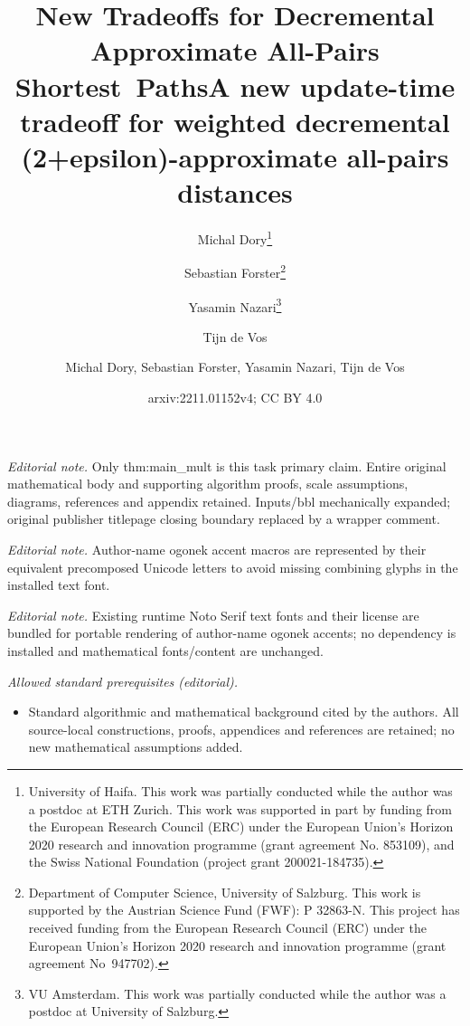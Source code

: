 \documentclass[11pt]{article}
\title{New Tradeoffs for Decremental Approximate All-Pairs Shortest~Paths}
\author{Michal Dory\thanks{University of Haifa. This work was partially conducted while the author was a postdoc at ETH Zurich. This work was supported in part by funding from the European Research Council (ERC) under the European Union’s Horizon 2020 research and innovation programme (grant agreement No. 853109), and the Swiss National Foundation (project grant 200021-184735).} \and  Sebastian Forster\thanks{Department of Computer Science, University of Salzburg. This work is supported by the Austrian Science Fund (FWF): P 32863-N. This project has received funding from the European Research Council (ERC) under the European Union's Horizon 2020 research and innovation programme (grant agreement No~947702).} \and Yasamin Nazari\thanks{VU Amsterdam. This work was partially conducted while the author was a postdoc at University of Salzburg.} \and Tijn de Vos\samethanks[2]}
\date{}
\title{A new update-time tradeoff for weighted decremental (2+epsilon)-approximate all-pairs distances}
\author{Michal Dory, Sebastian Forster, Yasamin Nazari, Tijn de Vos}
\date{arxiv:2211.01152v4; CC BY 4.0}
\theoremstyle{definition}
\theoremstyle{remark}
\begin{document}
\maketitle
\noindent\textit{Editorial note.} Only thm:main\_mult is this task primary claim. Entire original mathematical body and supporting algorithm proofs, scale assumptions, diagrams, references and appendix retained. Inputs/bbl mechanically expanded; original publisher titlepage closing boundary replaced by a wrapper comment.\par\medskip
\noindent\textit{Editorial note.} Author-name ogonek accent macros are represented by their equivalent precomposed Unicode letters to avoid missing combining glyphs in the installed text font.\par\medskip
\noindent\textit{Editorial note.} Existing runtime Noto Serif text fonts and their license are bundled for portable rendering of author-name ogonek accents; no dependency is installed and mathematical fonts/content are unchanged.\par\medskip
\noindent\textit{Allowed standard prerequisites (editorial).}\begin{itemize}
\item Standard algorithmic and mathematical background cited by the authors. All source-local constructions, proofs, appendices and references are retained; no new mathematical assumptions added.
\end{itemize}\medskip
\end{document}
